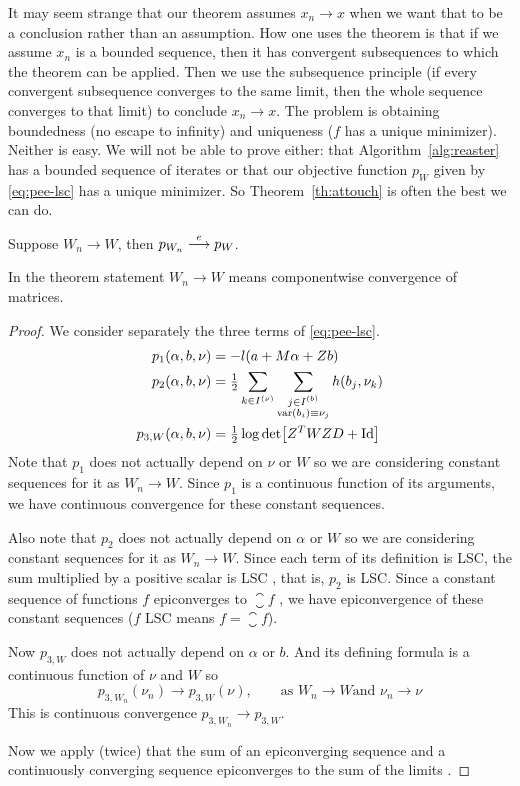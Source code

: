 It may seem strange that our theorem assumes $x_n \to x$ when we want
that to be a conclusion rather than an assumption.  How one uses the
theorem is that if we assume $x_n$ is a bounded sequence, then it has
convergent subsequences to which the theorem can be applied.  Then
we use the subsequence principle (if every convergent subsequence converges
to the same limit, then the whole sequence converges to that limit) to
conclude $x_n \to x$.  The problem is obtaining boundedness (no escape
to infinity) and uniqueness ($f$ has a unique minimizer).  Neither is
easy.  We will not be able to prove either: that Algorithm~\ref{alg:reaster}
has a bounded sequence of iterates or that our objective
function $p_W$ given by \eqref{eq:pee-lsc} has a unique minimizer.
So Theorem~\ref{th:attouch} is often the best we can do.

\begin{theorem} \label{th:pee-epi}
Suppose $W_n \to W$, then $p_{W_n} \stackrel{e}{\longrightarrow} p_{W}$.
\end{theorem}
In the theorem statement $W_n \to W$ means
componentwise convergence of matrices.
\begin{proof}
We consider separately the three terms of \eqref{eq:pee-lsc}.
\begin{align*}
   p_1(\alpha, b, \nu)
   & =
   - l(a + M \alpha + Z b)
   \\
   p_2(\alpha, b, \nu)
   & =
   \tfrac{1}{2}
   \sum_{k \in I^{(\nu)}}
   \sum_{\substack{j \in I^{(b)} \\ \operatorname{var}(b_i) \equiv \nu_j}}
   h(b_j, \nu_k)
   \\
   p_{3, W}(\alpha, b, \nu)
   & =
   \tfrac{1}{2} \log \det \bigl[ Z^T W Z D + \text{Id} \bigr]
\end{align*}
Note that $p_1$ does not actually depend on $\nu$ or $W$ so we are
considering constant sequences for it as $W_n \to W$.  Since $p_1$
is a continuous function of its arguments, we have continuous convergence
for these constant sequences.

Also note that $p_2$ does not actually depend on $\alpha$ or $W$ so we are
considering constant sequences for it as $W_n \to W$.  Since each term of
its definition is LSC, the sum multiplied by a positive scalar is LSC
\citep[Theorem~1.39]{rockafellar-wets}, that is, $p_2$ is LSC.
Since a constant sequence of functions $f$ epiconverges to $\closure f$
\citep[Proposition~7.4]{rockafellar-wets},
we have epiconvergence of these constant sequences
($f$ LSC means $f = \closure f$).

Now $p_{3, W}$ does not actually depend on $\alpha$ or $b$.  And its
defining formula is a continuous function of $\nu$ and $W$ so
$$
   p_{3, W_n}(\nu_n) \to p_{3, W}(\nu), \qquad \text{as $W_n \to W$
   and $\nu_n \to \nu$}
$$
This is continuous convergence $p_{3, W_n} \to p_{3, W}$.

Now we apply (twice) that the sum of an epiconverging sequence
and a continuously converging sequence epiconverges to the sum of the limits
\citep[Theorem~7.46 (b)]{rockafellar-wets}.
\end{proof}

